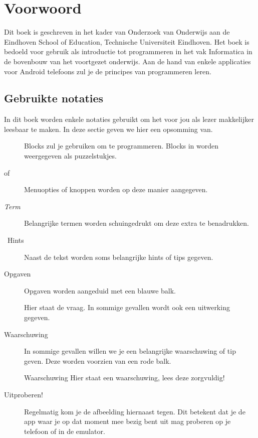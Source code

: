 \chapter*{Voorwoord}

Dit boek is geschreven in het kader van Onderzoek van Onderwijs aan de Eindhoven School of Education, Technische Universiteit Eindhoven. Het boek is bedoeld voor gebruik als introductie tot programmeren in het vak Informatica in de bovenbouw van het voortgezet onderwijs. Aan de hand van enkele applicaties voor Android telefoons zul je de principes van programmeren leren.

\section*{Gebruikte notaties}
In dit boek worden enkele notaties gebruikt om het voor jou als lezer makkelijker leesbaar te maken. In deze sectie geven we hier een opsomming van.

\begin{description}
   \item[] Blocks zul je gebruiken om te programmeren. Blocks in \ai worden weergegeven als puzzelstukjes. 
   \item[ of ] Menuopties of knoppen worden op deze manier aangegeven.
   \item[\emph{Term}] Belangrijke termen worden schuingedrukt om deze extra te benadrukken.
   \item[\lefthand\ Hints] Naast de tekst worden soms belangrijke hints of tips gegeven.
   \item[Opgaven] Opgaven worden aangeduid met een blauwe balk. 
     \begin{opgave}
       \opgVraag
	Hier staat de vraag.
       \opgUitwerking
         In sommige gevallen wordt ook een uitwerking gegeven.
     \end{opgave}
   \item[Waarschuwing] In sommige gevallen willen we je een belangrijke waarschuwing of tip geven. Deze worden voorzien van een rode balk.
     \begin{derivation}{Waarschuwing}
       Hier staat een waarschuwing, lees deze zorgvuldig!
      \end{derivation}
    \item[Uitproberen!] \runOpTelefoon{} Regelmatig kom je de afbeelding hiernaast tegen. Dit betekent dat je de app waar je op dat moment mee bezig bent uit mag proberen op je telefoon of in de emulator.
\end{description}